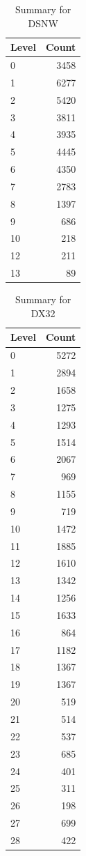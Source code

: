 \begin{table}[ht]
\centering
\begin{tabular}{lr}
  \hline
Level & Count \\ 
  \hline
0 & 3458 \\ 
  1 & 6277 \\ 
  2 & 5420 \\ 
  3 & 3811 \\ 
  4 & 3935 \\ 
  5 & 4445 \\ 
  6 & 4350 \\ 
  7 & 2783 \\ 
  8 & 1397 \\ 
  9 & 686 \\ 
  10 & 218 \\ 
  12 & 211 \\ 
  13 &  89 \\ 
   \hline
\end{tabular}
\caption{Summary for DSNW} 
\label{tab: DSNW}
\end{table}
\begin{table}[ht]
\centering
\begin{tabular}{lr}
  \hline
Level & Count \\ 
  \hline
0 & 5272 \\ 
  1 & 2894 \\ 
  2 & 1658 \\ 
  3 & 1275 \\ 
  4 & 1293 \\ 
  5 & 1514 \\ 
  6 & 2067 \\ 
  7 & 969 \\ 
  8 & 1155 \\ 
  9 & 719 \\ 
  10 & 1472 \\ 
  11 & 1885 \\ 
  12 & 1610 \\ 
  13 & 1342 \\ 
  14 & 1256 \\ 
  15 & 1633 \\ 
  16 & 864 \\ 
  17 & 1182 \\ 
  18 & 1367 \\ 
  19 & 1367 \\ 
  20 & 519 \\ 
  21 & 514 \\ 
  22 & 537 \\ 
  23 & 685 \\ 
  24 & 401 \\ 
  25 & 311 \\ 
  26 & 198 \\ 
  27 & 699 \\ 
  28 & 422 \\ 
   \hline
\end{tabular}
\caption{Summary for DX32} 
\label{tab: DX32}
\end{table}
